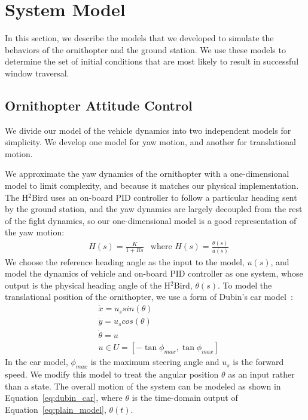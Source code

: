 \documentclass{aamas2013}
\begin{document}
\section{System Model}
\label{sec:system_model}

In this section, we describe the models that we developed to simulate the
behaviors of the ornithopter and the ground station. We use these models to
determine the set of initial conditions that are most likely to result in
successful window traversal.

\subsection{Ornithopter Attitude Control}
\label{sec:model_attitude}

We divide our model of the vehicle dynamics into two independent models for 
simplicity. We develop one model for yaw motion, and another for translational motion.

We approximate the yaw dynamics of the ornithopter with a one-dimensional model to 
limit complexity, and because it matches our physical implementation. The H$^2$Bird 
uses an on-board PID controller to follow a particular heading sent by the ground 
station, and the yaw dynamics are largely decoupled from the rest of the fight dynamics, 
so our one-dimensional model is a good representation of the yaw motion:
\begin{equation}
\label{eq:plain_model}
\begin{aligned}
& H(s) = \frac{K}{1 + Rs}
& \text{where }H(s) = \frac{\theta(s)}{u(s)}
\end{aligned}
\end{equation}
We choose the reference heading angle as the input to the model, $u(s)$, and
model the dynamics of vehicle and on-board PID controller as one system, whose
output is the physical heading angle of the H$^2$Bird, $\theta(s)$. To model the translational position of
the ornithopter, we use a form of Dubin's car model~\cite{lavalle:planning}:
\begin{equation}
\label{eq:dubin_car}
\begin{aligned}
& \dot{x} = u_{s}sin(\theta)\\
& \dot{y} = u_{s}cos(\theta)\\
& \dot{\theta} = u\\
& u \in U=[-\tan{\phi_{max}},\tan{\phi_{max}}]
\end{aligned}
\end{equation} 
In the car model, $\phi_{max}$ is the maximum steering angle and $u_{s}$ is
the forward speed. We modify this model to treat the angular position $\theta$
as an input rather than a state. The overall motion of the system can be
modeled as shown in Equation~\ref{eq:dubin_car}, where $\theta$ is the
time-domain output of Equation~\ref{eq:plain_model}, $\theta(t)$.
\end{document}
